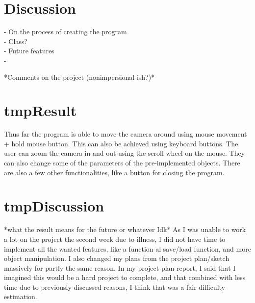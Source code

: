 \documentclass{article}
\begin{document}
	
	\section{Discussion}
		- On the process of creating the program \\
		- Class? \\
		- Future features \\
		- 
		
		
		
		*Comments on the project (nonimpersional-ish?)*
	
	
	
	\section{tmpResult}
	Thus far the program is able to move the camera around using mouse movement + hold mouse button.
	This can also be achieved using keyboard buttons.
	The user can zoom the camera in and out using the scroll wheel on the mouse.
	They can also change some of the parameters of the pre-implemented objects.
	There are also a few other functionalities, like a button for closing the program.
	
	
	
	\section{tmpDiscussion}
	*what the result means for the future or whatever Idk*
	As I was unable to work a lot on the project the second week due to illness,
	I did not have time to implement all the wanted features,
	like a function al save/load function, and more object manipulation.
	I also changed my plans from the project plan/sketch massively for partly the same reason. \cite{CGDProjPlanRep2016} %
	In my project plan report, I said that I imagined this would be a hard project to complete,
	and that combined with less time due to previously discussed reasons,
	I think that was a fair difficulty estimation.
	
	
	\clearpage
	
	
	
\end{document}
